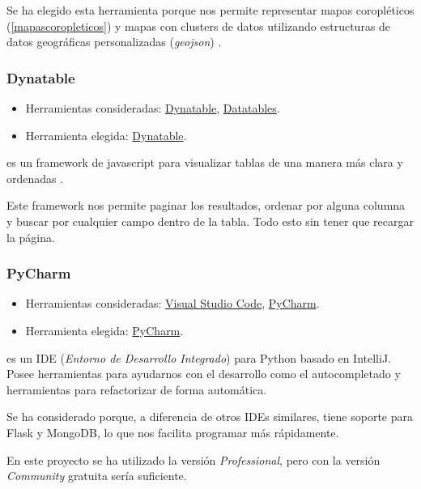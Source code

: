 Se ha elegido esta herramienta porque nos permite representar mapas coropléticos (\ref{mapascoropleticos}) y mapas con clusters de datos \cite{misc:foliumcluster} utilizando estructuras de datos geográficas personalizadas (\textit{geojson}) \cite{docs:geojson}.

\subsubsection{Dynatable}

\begin{itemize}
	\tightlist
	\item
	Herramientas consideradas:
	\href{https://www.dynatable.com/}{Dynatable}, 
	\href{https://datatables.net/}{Datatables}.
	\item
	Herramienta elegida:
	\href{https://www.dynatable.com/}{Dynatable}.
\end{itemize}

 es un framework de javascript para visualizar tablas de una manera más clara y ordenadas \cite{docs:dynatable}.

Este framework nos permite paginar los resultados, ordenar por alguna columna y buscar por cualquier campo dentro de la tabla. Todo esto sin tener que recargar la página.

\subsubsection{PyCharm}

\begin{itemize}
	\tightlist
	\item
	Herramientas consideradas:
	\href{https://code.visualstudio.com/}{Visual Studio Code}, 
	\href{https://www.jetbrains.com/pycharm/}{PyCharm}.
	\item
	Herramienta elegida:
	\href{https://www.jetbrains.com/pycharm/}{PyCharm}.
\end{itemize}

 es un IDE (\textit{Entorno de Desarrollo Integrado}) para Python basado en IntelliJ. Posee herramientas para ayudarnos con el desarrollo como el autocompletado y herramientas para refactorizar de forma automática.

Se ha considerado porque, a diferencia de otros IDEs similares, tiene soporte para Flask y MongoDB, lo que nos facilita programar más rápidamente.

En este proyecto se ha utilizado la versión \textit{Professional}, pero con la versión \textit{Community} gratuita sería suficiente.

